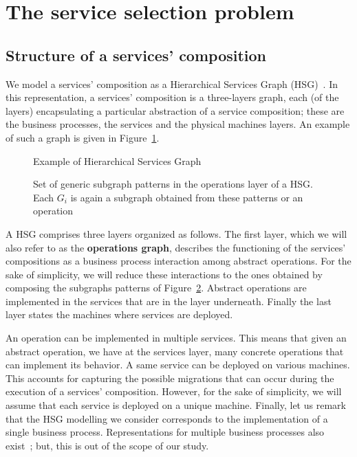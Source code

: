 \documentclass[a4paper]{article}
\begin{document}
\section{The service selection problem} \label{SSP}

\subsection{Structure of a services' composition}

We model a services' composition as a Hierarchical Services Graph (HSG)~\cite{GoldmanNgoko,mgc2012,JISA}. 
In this representation, a services' composition is a three-layers graph, each (of the layers) encapsulating a particular abstraction of a service 
composition; these are the business processes, the services and the physical machines layers. 
An example of such a graph is given in Figure~\ref{ExampleHSG}. 
\begin{figure}[htbp]
\centering
{}
\caption{Example of Hierarchical Services Graph}\label{ExampleHSG}
\end{figure}

\begin{figure}[htbp]
\centering
{}
\caption{Set of generic subgraph patterns in the operations layer of a HSG. Each $G_i$ 
is again a subgraph obtained from these patterns or an operation}\label{flows}
\end{figure}

A HSG comprises three layers organized as follows. The first layer, which we will also refer to as the \textbf{operations graph}, 
describes the functioning of the services' compositions as a business process interaction among abstract operations. 
For the sake of simplicity, we will reduce these interactions to the ones obtained by composing the subgraphs patterns of Figure~\ref{flows}. 
Abstract operations are implemented in the services that are in the layer underneath. Finally the last layer states the machines where 
services are deployed. 

An operation can be implemented in multiple services. This means that given an abstract operation, we have at the services 
layer, many concrete operations that can implement its behavior. A same service can be deployed on various machines. This accounts 
for capturing the possible migrations that can occur during the execution of a services' composition. However, for the sake of simplicity, 
we will assume that each service is deployed on a unique machine. 
Finally, let us remark that the HSG modelling we consider corresponds to the implementation of a single business process. 
Representations for multiple business processes also exist~\cite{mgc2012,JISA}; but, this is out of the scope of our 
study.
\end{document}
